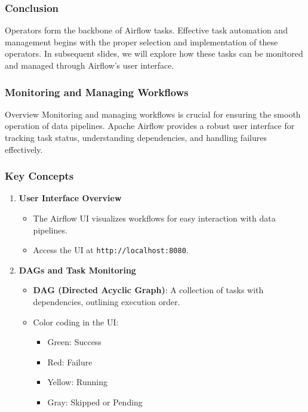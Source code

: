 \documentclass[aspectratio=169]{beamer}
\begin{document}
\begin{frame}[fragile]
    \frametitle{Conclusion}
    Operators form the backbone of Airflow tasks. Effective task automation and management begins with the proper selection and implementation of these operators. 
    In subsequent slides, we will explore how these tasks can be monitored and managed through Airflow's user interface.
\end{frame}

\begin{frame}[fragile]
    \frametitle{Monitoring and Managing Workflows}
    \begin{block}{Overview}
        Monitoring and managing workflows is crucial for ensuring the smooth operation of data pipelines. Apache Airflow provides a robust user interface for tracking task status, understanding dependencies, and handling failures effectively.
    \end{block}
\end{frame}

\begin{frame}[fragile]
    \frametitle{Key Concepts}
    \begin{enumerate}
        \item \textbf{User Interface Overview}
            \begin{itemize}
                \item The Airflow UI visualizes workflows for easy interaction with data pipelines.
                \item Access the UI at \texttt{http://localhost:8080}.
            \end{itemize}
        \item \textbf{DAGs and Task Monitoring}
            \begin{itemize}
                \item \textbf{DAG (Directed Acyclic Graph)}: A collection of tasks with dependencies, outlining execution order.
                \item Color coding in the UI: 
                \begin{itemize}
                    \item Green: Success
                    \item Red: Failure
                    \item Yellow: Running
                    \item Gray: Skipped or Pending
                \end{itemize}
            \end{itemize}
    \end{enumerate}
\end{frame}
\end{document}
